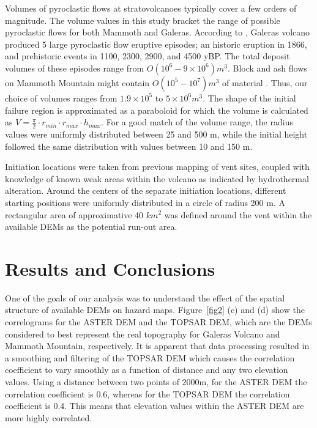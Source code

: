 \documentclass[12pt]{article}
\begin{document}
Volumes of pyroclastic flows at stratovolcanoes typically cover a few
orders of magnitude. The volume values in this study bracket the range
of possible pyroclastic flows for both Mammoth and Galeras.  According
to \citet{calvache_1990a}, Galeras volcano produced 5 large
pyroclastic flow eruptive episodes; an historic eruption in 1866, and
prehistoric events in 1100, 2300, 2900, and 4500 yBP.  The total
deposit volumes of these episodes range from $O(10^6 - 9\times 10^6)
m^3$.  Block and ash flows on Mammoth Mountain might contain $O(10^5 -
10^7) m^3$ of material \citep{Patra2005, Burkett2007}.  Thus, our
choice of volumes ranges from $1.9 \times 10^5$ to $5 \times 10^6
m^3$.  The shape of the initial failure region is approximated as a
paraboloid for which the volume is calculated as $
V=\frac{\pi}{2}\cdot r_{min}\cdot r_{max} \cdot h_{max}. $ For a good
match of the volume range, the radius values were uniformly
distributed between 25 and 500 m, while the initial height followed
the same distribution with values between 10 and 150 m.

Initiation locations were taken from previous mapping of vent sites,
coupled with knowledge of known weak areas within the volcano as
indicated by hydrothermal alteration.  Around the centers of the
separate initiation locations, different starting positions were
uniformly distributed in a circle of radius 200 m.  A rectangular area
of approximative 40 $km^2$ was defined around the vent within the
available DEMs as the potential run-out area.

\section{Results and Conclusions}

One of the goals of our analysis was to understand the effect of the
spatial structure of available DEMs on hazard maps. Figure~\ref{fig2}
(c) and (d) show the correlograms for the ASTER DEM and the TOPSAR
DEM, which are the DEMs considered to best represent the real
topography for Galeras Volcano and Mammoth Mountain, respectively. It
is apparent that data processing resulted in a smoothing and filtering
of the TOPSAR DEM which causes the correlation coefficient to vary
smoothly as a function of distance and any two elevation values.
Using a distance between two points of 2000m, for the ASTER DEM the
correlation coefficient is 0.6, whereas for the TOPSAR DEM the
correlation coefficient is 0.4. This means that elevation values
within the ASTER DEM are more highly correlated.
\end{document}
